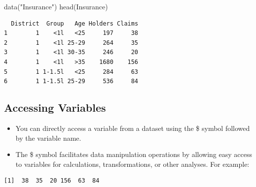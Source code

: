 \documentclass[
  letterpaper,
  DIV=11,
  numbers=noendperiod]{scrreprt}
\newenvironment{Shaded}{\begin{snugshade}}{\end{snugshade}}
\newcommand{\CommentTok}[1]{\textcolor[rgb]{0.37,0.37,0.37}{#1}}
\newcommand{\FunctionTok}[1]{\textcolor[rgb]{0.28,0.35,0.67}{#1}}
\newcommand{\NormalTok}[1]{\textcolor[rgb]{0.00,0.23,0.31}{#1}}
\newcommand{\SpecialCharTok}[1]{\textcolor[rgb]{0.37,0.37,0.37}{#1}}
\newcommand{\StringTok}[1]{\textcolor[rgb]{0.13,0.47,0.30}{#1}}
\providecommand{\tightlist}{%
  \setlength{\itemsep}{0pt}\setlength{\parskip}{0pt}}\usepackage{longtable,booktabs,array}
\begin{document}
\begin{Shaded}
\begin{Highlighting}[]
\FunctionTok{data}\NormalTok{(}\StringTok{"Insurance"}\NormalTok{)}
\FunctionTok{head}\NormalTok{(Insurance)}
\end{Highlighting}
\end{Shaded}

\begin{verbatim}
  District  Group   Age Holders Claims
1        1    <1l   <25     197     38
2        1    <1l 25-29     264     35
3        1    <1l 30-35     246     20
4        1    <1l   >35    1680    156
5        1 1-1.5l   <25     284     63
6        1 1-1.5l 25-29     536     84
\end{verbatim}

\subsection{Accessing Variables}\label{accessing-variables}

\begin{itemize}
\tightlist
\item
  You can directly access a variable from a dataset using the \$ symbol
  followed by the variable name.
\item
  The \$ symbol facilitates data manipulation operations by allowing
  easy access to variables for calculations, transformations, or other
  analyses. For example:
\end{itemize}

\begin{Shaded}
\end{Shaded}

\begin{verbatim}
[1]  38  35  20 156  63  84
\end{verbatim}

\begin{Shaded}
\end{Shaded}
\end{document}
